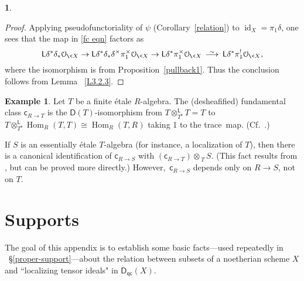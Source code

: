 \documentclass{compositio}
\theoremstyle{plain}
\theoremstyle{definition}
\newtheorem{cosa}[thm]{}
\newtheorem{subex}[equation]{Example}
\theoremstyle{remark}
\numberwithin{equation}{thm}
\begin{document}
\begin{cosa}
\begin{proof}
Applying pseudofunctoriality of $\psi$ (Corollary~\ref{relation}) to 
$\operatorname{id}_X=\pi_1\delta$, one sees that the  map in \eqref{fc eqn} factors as
\[
{\mathsf L}\delta^*\delta_*{\mathcal O_{{\mkern-1mu}\<X}}\to {\mathsf L}\delta^*\delta_*\delta^\times\pi_1^\times{\mathcal O_{{\mkern-1mu}\<X}}\to 
{\mathsf L}\delta^*\pi_1^\times{\mathcal O_{{\mkern-1mu}\<X}}{{\mkern8mu\longrightarrow \mkern-25.5mu{}^\sim\mkern17mu}}{\mathsf L}\delta^*\pi_1^!{\mathcal O_{{\mkern-1mu}\<X}},
\]
where the isomorphism is from Proposition~\ref{pullback1}.
Thus the conclusion follows from Lemma~  \ref{L3.2.3}.
\end{proof}
\end{cosa}
 
\begin{subex} Let $T$ be a finite \'etale $R$-algebra. The (desheafified) fundamental class 
${\boldsymbol{\mathsf{c}}}_{R\to T}$ is the ${\boldsymbol{\mathsf{D}}}(T)$-isomorphism from $T{\otimes^{\mathsf L}_{{{{T}^{\mathsf e}}}}} T =T$ 
to~$T{\otimes^{\mathsf L}_{{{{T}^{\mathsf e}}}}}\operatorname{Hom}_R(T,T)\cong\operatorname{Hom}_R(T,R)$ taking 1 to the trace~map. {}(Cf.~\cite[Example 2.6]{AJL4}.){\vspace{1pt}}

If $S$ is an essentially \'etale 
$T$-algebra (for instance, a localization of $T$), then there is a canonical
identification of ${\boldsymbol{\mathsf{c}}}_{R\to S}$ with $({\boldsymbol{\mathsf{c}}}_{R\to T})\otimes_{\>T} S$.
(This fact results from \cite[2.5 and 3.1]{AJL4}, but can be proved more directly.) 
However,~${\boldsymbol{\mathsf{c}}}_{R\to S}$ depends only on $R\to S$, not on $T$.

\end{subex} 

\appendix

\section{Supports} 
\label{Support}
The goal of this appendix is to establish some basic facts---used repeatedly in ~\S\ref{proper-support}---about the relation between subsets of a noetherian scheme $X$ and ``localizing tensor ideals" in ${{\boldsymbol{\mathsf{D}}}_{\mathsf{qc}}}(X)$.{\vspace{2pt}}
\end{document}
